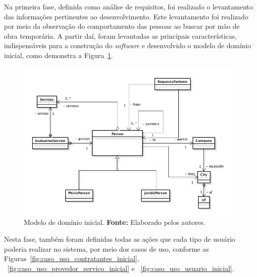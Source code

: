 \par Na primeira fase, definida como análise de requisitos, foi realizado o levantamento das informações pertinentes ao desenvolvimento. Este levantamento foi realizado por meio da observação do comportamento das pessoas ao buscar por mão de obra temporária. A partir daí, foram levantadas as principais características, indispensáveis para a construção do \textit{software} e desenvolvido o modelo de domínio inicial, como demonstra a Figura~\ref{fig:modelo_dominio_inicial}.

\begin{figure}[h!]
	\centerline{\includegraphics[scale=0.45]{./imagens/modelo-dominio-inicial.png}}
	\caption[Modelo de domínio inicial]
	{Modelo de domínio inicial. \textbf{Fonte:} Elaborado pelos autores.}
	\label{fig:modelo_dominio_inicial}
\end{figure}

\par Nesta fase, também foram definidas todas as ações que cada tipo de usuário poderia realizar no sistema, por meio dos casos de uso, conforme as Figuras~\ref{fig:caso_uso_contratantes_inicial}, ~\ref{fig:caso_uso_provedor_servico_inicial} e ~\ref{fig:caso_uso_usuario_inicial}.


